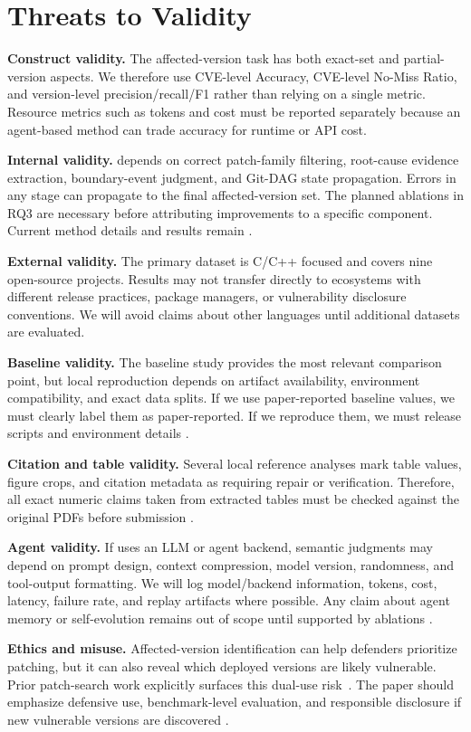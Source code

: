 \section{Threats to Validity}
\label{sec:threats}

\textbf{Construct validity.} The affected-version task has both exact-set and partial-version aspects. We therefore use CVE-level Accuracy, CVE-level No-Miss Ratio, and version-level precision/recall/F1 rather than relying on a single metric. Resource metrics such as tokens and cost must be reported separately because an agent-based method can trade accuracy for runtime or API cost.

\textbf{Internal validity.} \toolname depends on correct patch-family filtering, root-cause evidence extraction, boundary-event judgment, and Git-DAG state propagation. Errors in any stage can propagate to the final affected-version set. The planned ablations in RQ3 are necessary before attributing improvements to a specific component. Current method details and results remain .

\textbf{External validity.} The primary dataset is C/C++ focused and covers nine open-source projects. Results may not transfer directly to ecosystems with different release practices, package managers, or vulnerability disclosure conventions. We will avoid claims about other languages until additional datasets are evaluated.

\textbf{Baseline validity.} The baseline study provides the most relevant comparison point, but local reproduction depends on artifact availability, environment compatibility, and exact data splits. If we use paper-reported baseline values, we must clearly label them as paper-reported. If we reproduce them, we must release scripts and environment details .

\textbf{Citation and table validity.} Several local reference analyses mark table values, figure crops, and citation metadata as requiring repair or verification. Therefore, all exact numeric claims taken from extracted tables must be checked against the original PDFs before submission  .

\textbf{Agent validity.} If \toolname uses an LLM or agent backend, semantic judgments may depend on prompt design, context compression, model version, randomness, and tool-output formatting. We will log model/backend information, tokens, cost, latency, failure rate, and replay artifacts where possible. Any claim about agent memory or self-evolution remains out of scope until supported by ablations .

\textbf{Ethics and misuse.} Affected-version identification can help defenders prioritize patching, but it can also reveal which deployed versions are likely vulnerable. Prior patch-search work explicitly surfaces this dual-use risk~\cite{redebug2012}. The paper should emphasize defensive use, benchmark-level evaluation, and responsible disclosure if new vulnerable versions are discovered .
